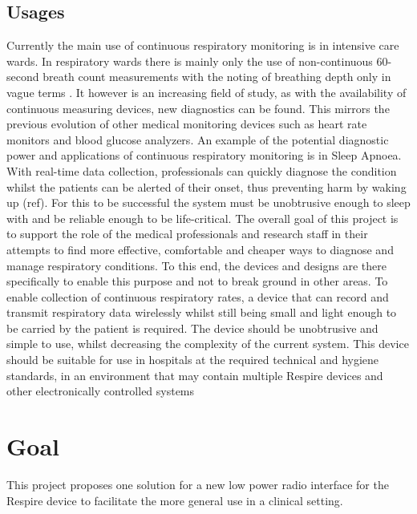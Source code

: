 \subsection{Usages}
Currently the main use of continuous respiratory monitoring is in intensive
care wards. In respiratory wards there is mainly only the use of non-continuous
60-second breath count measurements with the noting of breathing depth only in vague
terms \cite{Hunter2008}. It however is an increasing field of study, as with the availability of continuous measuring
devices, new diagnostics can be found. This mirrors the previous evolution of other medical
monitoring devices such as heart rate monitors and blood glucose analyzers.
An example of the potential diagnostic power and applications of continuous respiratory
monitoring is in Sleep Apnoea. With real-time data collection, professionals can quickly diagnose the
condition whilst the patients can be alerted of their onset, thus preventing harm by waking up (ref). %
For this to be successful the system must be unobtrusive enough to
sleep with and be reliable enough to be life-critical.
The overall goal of this project is to support the role of the medical
professionals and research staff in their attempts to find more
effective, comfortable and cheaper ways to diagnose and manage
respiratory conditions. To this end, the devices and designs are there specifically to enable this
purpose and not to break ground in other areas.
To enable collection of continuous respiratory rates, a device that can record and transmit
respiratory data wirelessly whilst still being small and light enough to be carried by the patient is
required. The device should be unobtrusive and simple to use, whilst decreasing the complexity of
the current system. This device should be suitable for use in hospitals at the required technical and
hygiene standards, in an environment that may contain multiple Respire devices and other
electronically controlled systems

\section{Goal}
This project proposes one solution for a new low power radio interface for the Respire device to
facilitate the more general use in a clinical setting.


